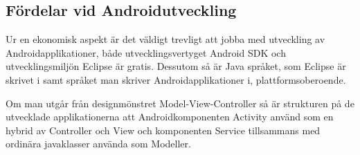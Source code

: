 \subsection{Fördelar vid Androidutveckling}
Ur en ekonomisk aspekt är det väldigt trevligt att jobba med utveckling av
Androidapplikationer, både utvecklingsvertyget Android SDK och utvecklingsmiljön
Eclipse är gratis. Dessutom så är Java språket, som Eclipse är skrivet i samt
språket man skriver Androidapplikationer i, plattformsoberoende.

Om man utgår från designmönstret Model-View-Controller \cite{MVC} så är
strukturen på de utvecklade applikationerna att Androidkomponenten Activity
\cite[Activity]{Android Reference} använd som en hybrid av Controller och View
och komponenten Service\cite[Service]{Android Reference} tillsammans med
ordinära javaklasser använda som Modeller.
